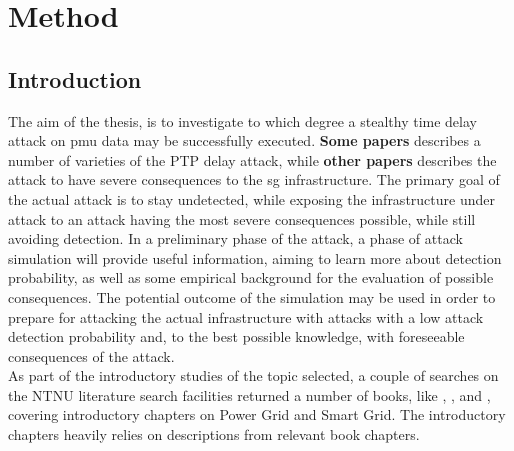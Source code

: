 \chapter{Method} 


\section{Introduction}




The aim of the thesis, is to investigate to which degree a stealthy time delay attack on \acrshort{pmu} data may be successfully  executed. \textbf{Some papers} describes a number of varieties of the PTP delay attack, while \textbf{other papers} describes the attack to have severe consequences to the \acrshort{sg} infrastructure. The primary goal of the actual attack is to stay undetected, while exposing the infrastructure under attack to an attack having the most severe consequences possible, while still avoiding detection.  In a preliminary phase of the attack, a phase of attack simulation will provide useful information, aiming to learn more about detection probability, as well as some empirical background for the evaluation of possible consequences.
The potential outcome of the simulation may be used in order to prepare for attacking the actual infrastructure with attacks with a low attack detection probability and, to the best possible knowledge, with foreseeable consequences of the attack.\\ 


As part of the introductory studies of the topic selected, a couple of searches on the NTNU literature search facilities returned a number of books, like \cite{BlumeStevenW2007Epsb}, \cite{kabalci2019smart}, and \cite{momoh2012smart}, covering introductory chapters on Power Grid and Smart Grid. The introductory chapters heavily relies on descriptions from relevant book chapters. 








